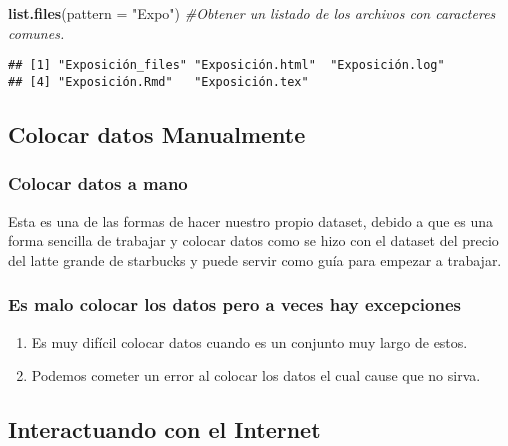 \documentclass[]{article}
\newenvironment{Shaded}{\begin{snugshade}}{\end{snugshade}}
\newcommand{\CommentTok}[1]{\textcolor[rgb]{0.56,0.35,0.01}{\textit{#1}}}
\newcommand{\DataTypeTok}[1]{\textcolor[rgb]{0.13,0.29,0.53}{#1}}
\newcommand{\KeywordTok}[1]{\textcolor[rgb]{0.13,0.29,0.53}{\textbf{#1}}}
\newcommand{\NormalTok}[1]{#1}
\newcommand{\StringTok}[1]{\textcolor[rgb]{0.31,0.60,0.02}{#1}}
\providecommand{\tightlist}{%
  \setlength{\itemsep}{0pt}\setlength{\parskip}{0pt}}
\begin{document}
\begin{Shaded}
\begin{Highlighting}[]
\KeywordTok{list.files}\NormalTok{(}\DataTypeTok{pattern =} \StringTok{"Expo"}\NormalTok{) }\CommentTok{#Obtener un listado de los archivos con caracteres comunes.}
\end{Highlighting}
\end{Shaded}

\begin{verbatim}
## [1] "Exposición_files" "Exposición.html"  "Exposición.log"  
## [4] "Exposición.Rmd"   "Exposición.tex"
\end{verbatim}

\hypertarget{colocar-datos-manualmente}{%
\subsection{Colocar datos Manualmente}\label{colocar-datos-manualmente}}

\hypertarget{colocar-datos-a-mano}{%
\subsubsection{Colocar datos a mano}\label{colocar-datos-a-mano}}

Esta es una de las formas de hacer nuestro propio dataset, debido a que
es una forma sencilla de trabajar y colocar datos como se hizo con el
dataset del precio del latte grande de starbucks y puede servir como
guía para empezar a trabajar.

\hypertarget{es-malo-colocar-los-datos-pero-a-veces-hay-excepciones}{%
\subsubsection{Es malo colocar los datos pero a veces hay
excepciones}\label{es-malo-colocar-los-datos-pero-a-veces-hay-excepciones}}

\begin{enumerate}
\def\labelenumi{\arabic{enumi}.}
\tightlist
\item
  Es muy difícil colocar datos cuando es un conjunto muy largo de estos.
\item
  Podemos cometer un error al colocar los datos el cual cause que no
  sirva.
\end{enumerate}

\hypertarget{interactuando-con-el-internet}{%
\subsection{Interactuando con el
Internet}\label{interactuando-con-el-internet}}
\end{document}
